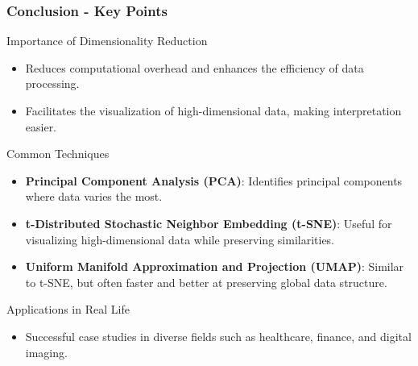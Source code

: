 \documentclass[aspectratio=169]{beamer}
\begin{document}
\begin{frame}[fragile]
    \frametitle{Conclusion - Key Points}
    \begin{block}{Importance of Dimensionality Reduction}
        \begin{itemize}
            \item Reduces computational overhead and enhances the efficiency of data processing.
            \item Facilitates the visualization of high-dimensional data, making interpretation easier.
        \end{itemize}
    \end{block}

    \begin{block}{Common Techniques}
        \begin{itemize}
            \item \textbf{Principal Component Analysis (PCA)}: Identifies principal components where data varies the most.
            \item \textbf{t-Distributed Stochastic Neighbor Embedding (t-SNE)}: Useful for visualizing high-dimensional data while preserving similarities.
            \item \textbf{Uniform Manifold Approximation and Projection (UMAP)}: Similar to t-SNE, but often faster and better at preserving global data structure.
        \end{itemize}
    \end{block}

    \begin{block}{Applications in Real Life}
        \begin{itemize}
            \item Successful case studies in diverse fields such as healthcare, finance, and digital imaging.
        \end{itemize}
    \end{block}
\end{frame}
\end{document}
